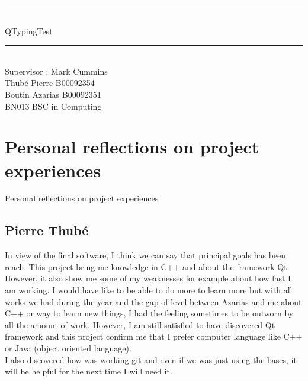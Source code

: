 \documentclass[12pt]{report}
\newcommand{\Mline}{\hrule \mbox{}\\[0.1cm]}
\begin{document}
\begin{titlepage}
\begin{center}


\Mline
{ \LARGE QTypingTest \\[0.4cm] }
\Mline

\textsf{Supervisor : Mark Cummins}\\[3cm]

\textsf{Thubé Pierre B00092354\\
	Boutin Azarias B00092351\\[2cm]
	BN013 BSC in Computing}

\end{center}
\end{titlepage}

\setcounter{page}{2}

\tableofcontents







\part{Personal reflections on project experiences}
Personal reflections on project experiences

\chapter{Pierre Thubé}
In view of the final software, I think we can say that principal goals has been reach. This project bring me knowledge in C++ and about the framework Qt. However, it also show me some of my weaknesses for example about how fast I am working. I would have like to be able to do more to learn more but with all works we had during the year and the gap of level between Azarias and me about C++ or way to learn new things, I had the feeling sometimes to be outworn by all the amount of work. However, I am still satisfied to have discovered Qt framework and this project confirm me that I prefer computer language like C++ or Java (object oriented language).\\
I also discovered how was working git and even if we was just using the bases, it will be helpful for the next time I will need it. 
\end{document}

